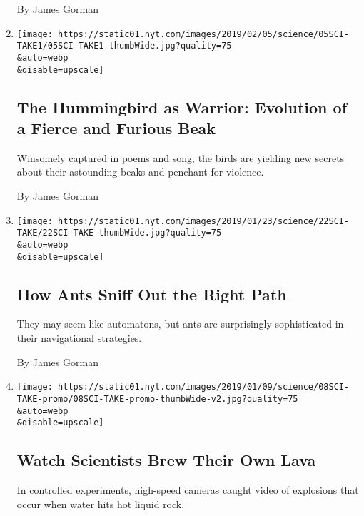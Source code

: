 \begin{enumerate}
  By James Gorman
\item
  \href{/2019/02/05/science/hummingbirds-science-take.html}{}

  \texttt{[image: https://static01.nyt.com/images/2019/02/05/science/05SCI-TAKE1/05SCI-TAKE1-thumbWide.jpg?quality=75\\\&auto=webp\\\&disable=upscale]}

  \hypertarget{the-hummingbird-as-warrior-evolution-of-a-fierce-and-furious-beak}{%
  \subsection{The Hummingbird as Warrior: Evolution of a Fierce and
  Furious
  Beak}\label{the-hummingbird-as-warrior-evolution-of-a-fierce-and-furious-beak}}

  Winsomely captured in poems and song, the birds are yielding new
  secrets about their astounding beaks and penchant for violence.

  By James Gorman
\item
  \href{/2019/01/22/science/ants-navigate-scent.html}{}

  \texttt{[image: https://static01.nyt.com/images/2019/01/23/science/22SCI-TAKE/22SCI-TAKE-thumbWide.jpg?quality=75\\\&auto=webp\\\&disable=upscale]}

  \hypertarget{how-ants-sniff-out-the-right-path}{%
  \subsection{How Ants Sniff Out the Right
  Path}\label{how-ants-sniff-out-the-right-path}}

  They may seem like automatons, but ants are surprisingly sophisticated
  in their navigational strategies.

  By James Gorman
\item
  \href{/2019/01/08/science/volcanos-explosions-lava.html}{}

  \texttt{[image: https://static01.nyt.com/images/2019/01/09/science/08SCI-TAKE-promo/08SCI-TAKE-promo-thumbWide-v2.jpg?quality=75\\\&auto=webp\\\&disable=upscale]}

  \hypertarget{watch-scientists-brew-their-own-lava}{%
  \subsection{Watch Scientists Brew Their Own
  Lava}\label{watch-scientists-brew-their-own-lava}}

  In controlled experiments, high-speed cameras caught video of
  explosions that occur when water hits hot liquid rock.


\end{enumerate}
